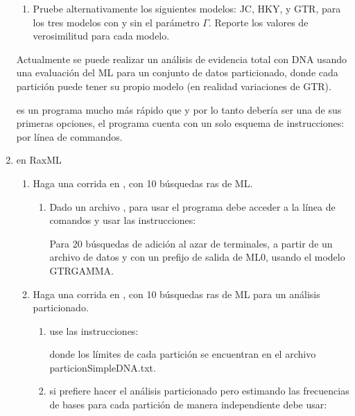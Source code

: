 \begin{enumerate}
\begin{enumerate}
		\item Pruebe alternativamente los siguientes modelos: JC, HKY, y GTR, para los tres modelos con y sin el par\'ametro $\Gamma$. Reporte los valores de verosimilitud para cada modelo.


	\end{enumerate}


  Actualmente se puede realizar un an\'alisis de evidencia total con DNA usando una evaluaci\'on del ML para un conjunto de datos particionado, donde cada partici\'on puede tener su propio modelo (en realidad variaciones de GTR).

   es un programa mucho m\'as r\'apido que  y por lo tanto deber\'ia ser una de sus primeras opciones, el programa cuenta con un solo esquema de instrucciones: por l\'inea de commandos.

  \item{en RaxML}

	\begin{enumerate}
		\item Haga una corrida en , con 10 b\'usquedas ras de ML.
		\begin{enumerate}
			\item Dado un archivo , para usar el programa debe acceder a la l\'inea de comandos y usar las instrucciones:

			
			Para 20 b\'usquedas de adici\'on al azar de terminales, a partir de un archivo de datos   y con un prefijo de salida de ML0, usando el modelo GTRGAMMA.

		\end{enumerate}

		\item Haga una corrida en , con 10 b\'usquedas ras de ML para un an\'alisis particionado.

		    \begin{enumerate}
			  \item  use las instrucciones: 

			  donde los l\'imites de cada partici\'on se encuentran en el archivo particionSimpleDNA.txt.

			  \item si prefiere hacer el an\'alisis particionado pero estimando las frecuencias de bases para cada partici\'on de manera independiente debe usar:


\end{enumerate}
\end{enumerate}
\end{enumerate}
